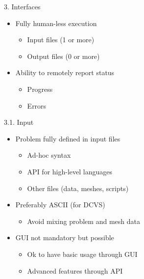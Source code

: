 \documentclass[
  ignorenonframetext,
  aspectratio=169,
]{beamer}
\providecommand{\tightlist}{%
  \setlength{\itemsep}{0pt}\setlength{\parskip}{0pt}}
\begin{document}
\begin{frame}[fragile]{}
\protect\hypertarget{section-9}{}
\begin{columns}[T]
\begin{column}{0.5\textwidth}
\begin{block}{3. Interfaces}
\protect\hypertarget{interfaces}{}
\begin{itemize}
\tightlist
\item
  Fully human-less execution

  \begin{itemize}
  \tightlist
  \item
    Input files (1 or more)
  \item
    Output files (0 or more)
  \end{itemize}
\item
  Ability to remotely report status

  \begin{itemize}
  \tightlist
  \item
    Progress
  \item
    Errors
  \end{itemize}
\end{itemize}

\begin{block}{3.1. Input}
\protect\hypertarget{input}{}
\begin{itemize}
\tightlist
\item
  Problem fully defined in input files

  \begin{itemize}
  \tightlist
  \item
    Ad-hoc syntax
  \item
    API for high-level languages
  \item
    Other files (data, meshes, scripts)
  \end{itemize}
\item
  Preferably ASCII (for DCVS)

  \begin{itemize}
  \tightlist
  \item
    Avoid mixing problem and mesh data
  \end{itemize}
\item
  GUI not mandatory but possible

  \begin{itemize}
  \tightlist
  \item
    Ok to have basic usage through GUI
  \item
    Advanced features through API
  \end{itemize}
\end{itemize}
\end{block}
\end{block}
\end{column}


\end{columns}
\end{frame}
\end{document}

